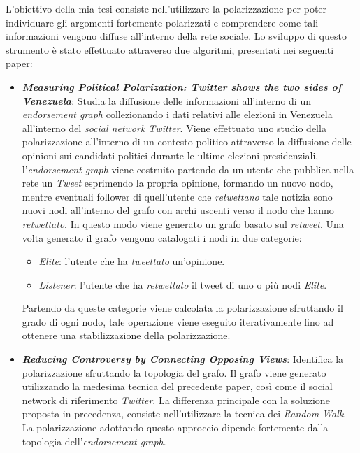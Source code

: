 L'obiettivo della mia tesi consiste nell'utilizzare la polarizzazione per poter individuare gli argomenti fortemente polarizzati e comprendere come tali informazioni vengono diffuse all'interno della rete sociale.
Lo sviluppo di questo strumento è stato effettuato attraverso due algoritmi, presentati nei seguenti paper:
\begin{itemize}
\item \textbf{\textit{Measuring Political Polarization: Twitter shows the two sides of Venezuela}}:
Studia la diffusione delle informazioni all'interno di un \textit{endorsement graph} collezionando i dati relativi alle elezioni in Venezuela all'interno del \textit{social network Twitter}. Viene effettuato uno studio della polarizzazione all'interno di un contesto politico attraverso la diffusione delle opinioni sui candidati politici durante le ultime elezioni presidenziali, l'\textit{endorsement graph} viene costruito partendo da un utente che pubblica nella rete un \textit{Tweet} esprimendo la propria opinione, formando un nuovo nodo, mentre eventuali follower di quell'utente che \textit{retwettano} tale notizia sono nuovi nodi all'interno del grafo con archi uscenti verso il nodo che hanno \textit{retwettato}. In questo modo viene generato un grafo basato sul \textit{retweet}.
Una volta generato il grafo vengono catalogati i nodi in due categorie:
\begin{itemize}
\item \textit{Elite}: l'utente che ha \textit{tweettato} un'opinione.
\item \textit{Listener}: l'utente che ha \textit{retwettato} il tweet di uno o più nodi \textit{Elite}.
\end{itemize}
Partendo da queste categorie viene calcolata la polarizzazione sfruttando il grado di ogni nodo, tale operazione viene eseguito iterativamente fino ad ottenere una stabilizzazione della polarizzazione.

\item \textbf{\textit{Reducing Controversy by Connecting Opposing Views}}:
Identifica la polarizzazione sfruttando la topologia del grafo. Il grafo viene generato utilizzando la medesima tecnica del precedente paper, così come il social network di riferimento \textit{Twitter}. %
La differenza principale con la soluzione proposta in precedenza, consiste nell'utilizzare la tecnica dei \textit{Random Walk}. La polarizzazione adottando questo approccio dipende fortemente dalla topologia dell'\textit{endorsement graph}. 
\end{itemize}

